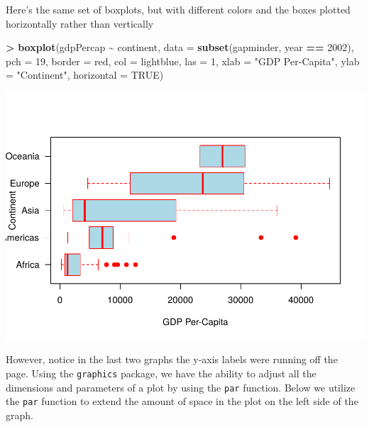\documentclass[
]{krantz}
\makeatletter
\newenvironment{Shaded}{\begin{snugshade}}{\end{snugshade}}
\newcommand{\DataTypeTok}[1]{\textcolor[rgb]{0.27,0.27,0.27}{#1}}
\newcommand{\DecValTok}[1]{\textcolor[rgb]{0.06,0.06,0.06}{#1}}
\newcommand{\KeywordTok}[1]{\textcolor[rgb]{0.27,0.27,0.27}{\textbf{#1}}}
\newcommand{\NormalTok}[1]{#1}
\newcommand{\OperatorTok}[1]{\textcolor[rgb]{0.43,0.43,0.43}{\textbf{#1}}}
\newcommand{\OtherTok}[1]{\textcolor[rgb]{0.37,0.37,0.37}{#1}}
\newcommand{\StringTok}[1]{\textcolor[rgb]{0.5,0.5,0.5}{#1}}
\newenvironment{kframe}{%
\medskip{}
\setlength{\fboxsep}{.8em}
 \def\at@end@of@kframe{}%
 \ifinner\ifhmode%
  \def\at@end@of@kframe{\end{minipage}}%
  \begin{minipage}{\columnwidth}%
 \fi\fi%
 \def\FrameCommand##1{\hskip\@totalleftmargin \hskip-\fboxsep
 \colorbox{shadecolor}{##1}\hskip-\fboxsep
     \hskip-\linewidth \hskip-\@totalleftmargin \hskip\columnwidth}%
 \MakeFramed {\advance\hsize-\width
   \@totalleftmargin\z@ \linewidth\hsize
   \@setminipage}}%
 {\par\unskip\endMakeFramed%
 \at@end@of@kframe}
\renewenvironment{Shaded}{\begin{kframe}}{\end{kframe}}
\makeatother
\begin{document}
Here's the same set of boxplots, but with different colors and the boxes plotted horizontally rather than vertically

\begin{Shaded}
\begin{Highlighting}[]
\OperatorTok{\textgreater{}}\StringTok{ }\KeywordTok{boxplot}\NormalTok{(gdpPercap }\OperatorTok{\textasciitilde{}}\StringTok{ }\NormalTok{continent, }\DataTypeTok{data =} \KeywordTok{subset}\NormalTok{(gapminder, year }\OperatorTok{==}\StringTok{ }\DecValTok{2002}\NormalTok{), }\DataTypeTok{pch =} \DecValTok{19}\NormalTok{, }\DataTypeTok{border =} \StringTok{\textquotesingle{}red\textquotesingle{}}\NormalTok{, }\DataTypeTok{col =} \StringTok{\textquotesingle{}lightblue\textquotesingle{}}\NormalTok{, }\DataTypeTok{las =} \DecValTok{1}\NormalTok{, }\DataTypeTok{xlab =} \StringTok{"GDP Per{-}Capita"}\NormalTok{, }\DataTypeTok{ylab =} \StringTok{"Continent"}\NormalTok{, }\DataTypeTok{horizontal =} \OtherTok{TRUE}\NormalTok{)}
\end{Highlighting}
\end{Shaded}

\includegraphics{bookdown_files/figure-latex/unnamed-chunk-355-1.pdf}

However, notice in the last two graphs the y-axis labels were running off the page. Using the \texttt{graphics} package, we have the ability to adjust all the dimensions and parameters of a plot by using the \texttt{par} function. Below we utilize the \texttt{par} function to extend the amount of space in the plot on the left side of the graph.
\end{document}
